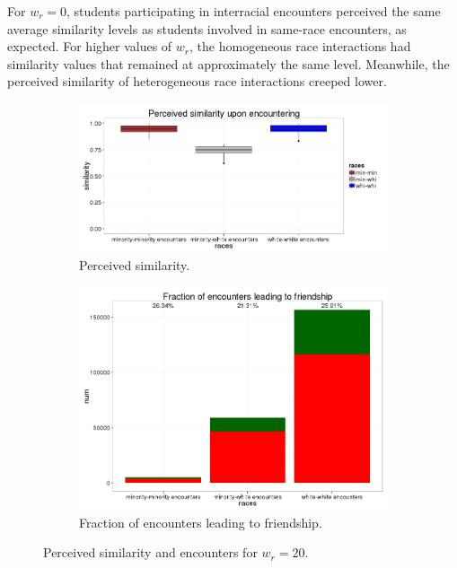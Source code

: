 
For $w_r=0$, students participating in interracial encounters perceived the
same average similarity levels as students involved in same-race encounters,
as expected. For higher values of $w_r$, the homogeneous race interactions had
similarity values that remained at approximately the same level. Meanwhile,
the perceived similarity of heterogeneous race interactions creeped lower.

\begin{figure}
\begin{subfigure}{.5\textwidth}
  \centering
    \includegraphics[width=1.2\textwidth]{similarityBoxplots20.png}
      \caption{Perceived similarity.}
\end{subfigure}
\begin{subfigure}{.5\textwidth}
    \includegraphics[width=\textwidth]{encountersGraph20.png}
      \caption{Fraction of encounters leading to friendship.}
\end{subfigure}
\caption{Perceived similarity and encounters for $w_r=20$.}
\end{figure}

